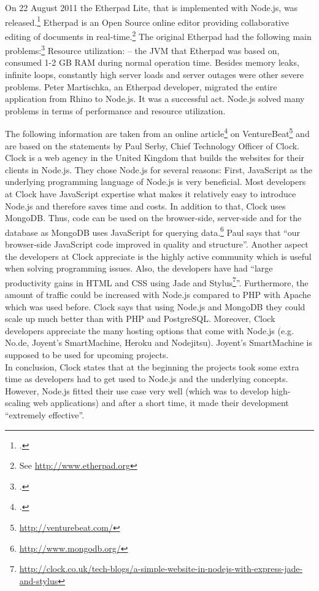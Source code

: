 \begin{appendices}
\begin{subappendices}
\label{app:etherpad}
On 22 August 2011 the Etherpad Lite, that is implemented with Node.js, was released.\footcite[Cf.][]{Martischka_2011}  Etherpad is an Open Source online editor providing collaborative editing of documents in real-time.\footnote{See \url{http://www.etherpad.org}} The original Etherpad had the following main problems:\footcite[Cf.][]{Martischka_2011} Resource utilization: – the JVM that Etherpad was based on, consumed 1-2 GB RAM during normal operation time. Besides memory leaks, infinite loops, constantly high server loads and server outages were other severe problems.
Peter Martischka, an Etherpad developer, migrated the entire application from Rhino to Node.js. It was a successful act. Node.js solved many problems in terms of performance and resource utilization. 

\label{app:case_clock}

The following information are taken from an online article\footcite[Cf.][]{serby_2012} on VentureBeat\footnote{\url{http://venturebeat.com/}} and are based on the statements by Paul Serby, Chief Technology Officer of Clock.
Clock is a web agency in the United Kingdom that builds the websites for their clients in Node.js. They chose Node.js for several reasons:
First, JavaScript as the underlying programming language of Node.js is very beneficial. Most developers at Clock have JavaScript expertise what makes it relatively easy to introduce Node.js and therefore saves time and costs. In addition to that, Clock uses MongoDB. Thus, code can be used on the browser-side, server-side and for the database as MongoDB uses JavaScript for querying data.\footnote{\url{http://www.mongodb.org/}}
Paul says that “our browser-side JavaScript code improved in quality and structure”. Another aspect the developers at Clock appreciate is the highly active community which is useful when solving programming issues. Also, the developers have had “large productivity gains in HTML and CSS using Jade and Stylus\footnote{\url{http://clock.co.uk/tech-blogs/a-simple-website-in-nodejs-with-express-jade-and-stylus}}”.
Furthermore, the amount of traffic could be increased with Node.js compared to PHP with Apache which was used before. Clock says that using Node.js and MongoDB they could scale up much better than with PHP and PostgreSQL. Moreover, Clock developers appreciate the many hosting options that come with Node.js (e.g. No.de, Joyent’s SmartMachine, Heroku and Nodejitsu). Joyent’s SmartMachine is supposed to be used for upcoming projects.\\
In conclusion, Clock states that at the beginning the projects took some extra time as developers had to get used to Node.js and the underlying concepts. However, Node.js fitted their use case very well (which was to develop high-scaling web applications) and after a short time, it made their development “extremely effective”.




\end{subappendices}
\end{appendices}

